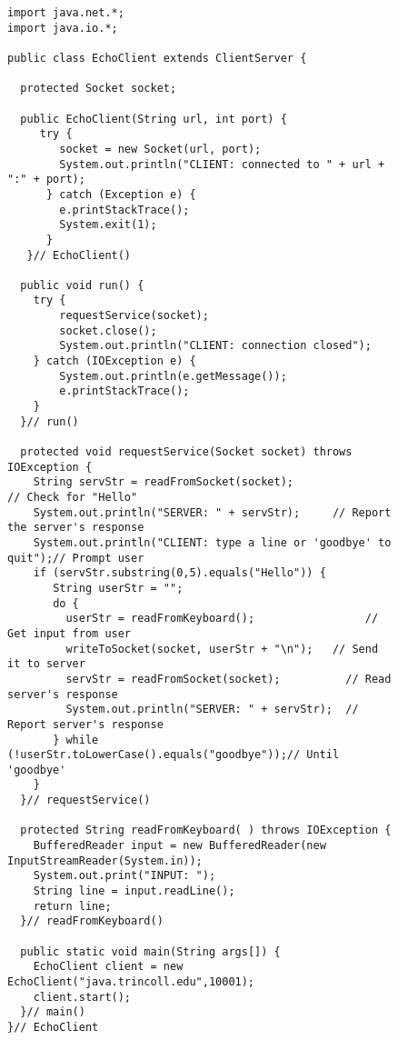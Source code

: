 \begin{figure}[p]
\jjjprogstart
\begin{jjjlisting}[37pc]
\begin{lstlisting}
import java.net.*;
import java.io.*;

public class EchoClient extends ClientServer {

  protected Socket socket;

  public EchoClient(String url, int port) {
     try {
        socket = new Socket(url, port);
        System.out.println("CLIENT: connected to " + url + ":" + port);
      } catch (Exception e) {
        e.printStackTrace();
        System.exit(1);
      }
   }// EchoClient()

  public void run() {
    try {
        requestService(socket);
        socket.close();
        System.out.println("CLIENT: connection closed");
    } catch (IOException e) {
        System.out.println(e.getMessage());
        e.printStackTrace();
    }
  }// run()

  protected void requestService(Socket socket) throws IOException {
    String servStr = readFromSocket(socket);                 // Check for "Hello"
    System.out.println("SERVER: " + servStr);     // Report the server's response
    System.out.println("CLIENT: type a line or 'goodbye' to quit");// Prompt user
    if (servStr.substring(0,5).equals("Hello")) {
       String userStr = "";
       do {
         userStr = readFromKeyboard();                 // Get input from user
         writeToSocket(socket, userStr + "\n");   // Send it to server
         servStr = readFromSocket(socket);          // Read server's response
         System.out.println("SERVER: " + servStr);  // Report server's response
       } while (!userStr.toLowerCase().equals("goodbye"));// Until 'goodbye'
    }
  }// requestService()

  protected String readFromKeyboard( ) throws IOException {
    BufferedReader input = new BufferedReader(new InputStreamReader(System.in));
    System.out.print("INPUT: ");
    String line = input.readLine();
    return line;
  }// readFromKeyboard()

  public static void main(String args[]) {
    EchoClient client = new EchoClient("java.trincoll.edu",10001);
    client.start();
  }// main()
}// EchoClient
\end{lstlisting}
\end{jjjlisting}
\end{figure}


